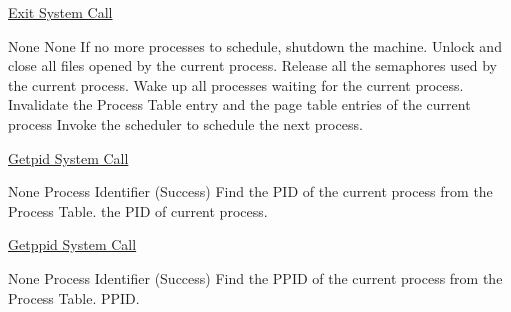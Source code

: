 
\begin{algorithm}
\caption{\href{http://exposnitc.github.io/os_design-files/exit.html}{Exit System Call}}
\begin{algorithmic}
\REQUIRE None
\ENSURE None
\STATE If no more processes to schedule, shutdown the machine.    
\STATE Unlock and close all files opened by the current process.   
\STATE Release all the semaphores used by the current process.     
\STATE Wake up all processes waiting for the current process.     
\STATE Invalidate the Process Table entry and the page table entries of the current process
\STATE Invoke the scheduler to schedule the next process.  
\end{algorithmic}
\end{algorithm}


\begin{algorithm}
\caption{\href{http://exposnitc.github.io/os_design-files/proc_misc.html#getpid}{Getpid System Call}}
\begin{algorithmic}
\REQUIRE None
\ENSURE Process Identifier (Success) 
\STATE Find the PID of the current process from the Process Table.
\RETURN the PID of current process. 
\end{algorithmic}
\end{algorithm}


\begin{algorithm}
\caption{\href{http://exposnitc.github.io/os_design-files/proc_misc.html#getppid}{Getppid System Call}}
\begin{algorithmic}
\REQUIRE None
\ENSURE Process Identifier (Success) 
 \STATE Find the PPID of the current process from the Process Table.
\RETURN PPID.
\end{algorithmic}
\end{algorithm}


